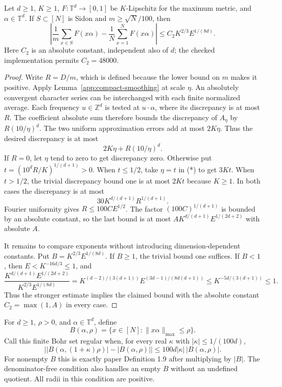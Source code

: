 \begin{theorem}
\label{app:smooth-bohr}
\leanok
{}
Let $d\geq1$, $K\geq1$, $F:\mathbb T^d\to[0,1]$ be $K$-Lipschitz for
the maximum metric, and $\alpha\in\mathbb T^d$.  If $S\subset[N]$ is
Sidon and $m\geq\sqrt N/100$, then
\[
 \left|\frac1m\sum_{x\in S}F(x\alpha)
       -\frac1N\sum_{x=1}^NF(x\alpha)\right|
 \leq C_2 K^{2/3}E^{1/(8d)}.
\]
Here $C_2$ is an absolute constant, independent also of $d$; the checked
implementation permits $C_2=48000$.
\end{theorem}
\begin{proof}
Write $R=D/m$, which is defined because the lower bound on $m$ makes it
positive.  Apply Lemma~\ref{app:compact-smoothing} at scale $\eta$.
An absolutely convergent character series can be interchanged with each
finite normalized average.  Each frequency $u\in\mathbb Z^d$ is tested at
$u\cdot\alpha$, where its discrepancy is at most $R$.
The coefficient absolute sum therefore bounds the discrepancy of
$A_\eta$ by $R(10/\eta)^d$.
The two uniform approximation errors add at most $2K\eta$.
Thus the desired discrepancy is at most
\[
 2K\eta+R(10/\eta)^d.                                   \tag{*}
\]
If $R=0$, let $\eta$ tend to zero to get discrepancy zero.
Otherwise put $t=(10^dR/K)^{1/(d+1)}>0$.
When $t\leq1/2$, take $\eta=t$ in (*) to get $3Kt$.
When $t>1/2$, the trivial discrepancy bound one is at most $2Kt$ because
$K\geq1$.  In both cases the discrepancy is at most
\[
 30K^{d/(d+1)}R^{1/(d+1)}.
\]
Fourier uniformity gives $R\leq100C E^{1/2}$.
The factor $(100C)^{1/(d+1)}$ is bounded by an absolute constant, so the
last bound is at most $A K^{d/(d+1)}E^{1/(2d+2)}$ with absolute $A$.

It remains to compare exponents without introducing dimension-dependent
constants.  Put $B=K^{2/3}E^{1/(8d)}$.  If $B\geq1$, the trivial bound
one suffices.  If $B<1$, then $E<K^{-16d/3}\leq1$, and
\[
 \frac{K^{d/(d+1)}E^{1/(2d+2)}}{K^{2/3}E^{1/(8d)}}
 =K^{(d-2)/(3(d+1))}E^{(3d-1)/(8d(d+1))}
 \leq K^{-5d/(3(d+1))}\leq1.
\]
Thus the stronger estimate implies the claimed bound with the absolute
constant $C_2=\max(1,A)$ in every case.
\end{proof}

\begin{definition}
\label{app:regular-bohr}
\leanok
For $d\geq1$, $\rho>0$, and $\alpha\in\mathbb T^d$, define
\[
 B(\alpha,\rho)=\{x\in[N]:\|x\alpha\|_{\max}\leq\rho\}.
\]
Call this finite Bohr set regular when, for every real $\kappa$ with
$|\kappa|\leq1/(100d)$,
\[
 \left||B(\alpha,(1+\kappa)\rho)|-|B(\alpha,\rho)|\right|
 \leq100d|\kappa|\,|B(\alpha,\rho)|.
\]
For nonempty $B$ this is exactly paper Definition 1.9 after multiplying by
$|B|$.  The denominator-free condition also handles an empty $B$ without
an undefined quotient.  All radii in this condition are positive.
\end{definition}

